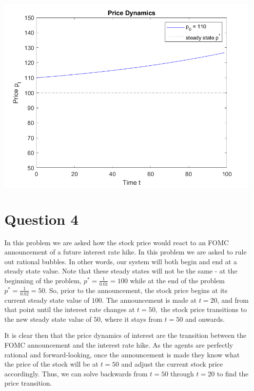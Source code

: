 \documentclass[11pt]{article} %
\begin{document}
\includegraphics{dynamics_110} \\

\section{Question 4}
In this problem we are asked how the stock price would react to an FOMC announcement of a future interest rate hike. In this problem we are asked to rule out rational bubbles. In other words, our system will both begin and end at a steady state value. Note that these steady states will not be the same - at the beginning of the problem, $p^{*} = \frac{1}{0.01} = 100$ while at the end of the problem $p^{*} = \frac{1}{0.02} = 50.$ So, prior to the announcement, the stock price begins at its current steady state value of $100$. The announcement is made at $t=20$, and from that point until the interest rate changes at $t=50,$ the stock price transitions to the new steady state value of $50$, where it stays from $t=50$ and onwards.

It is clear then that the price dynamics of interest are the transition between the FOMC announcement and the interest rate hike. As the agents are perfectly rational and forward-looking, once the announcement is made they know what the price of the stock will be at $t=50$ and adjust the current stock price accordingly. Thus, we can solve backwards from $t=50$ through $t=20$ to find the price transition.
\end{document}
